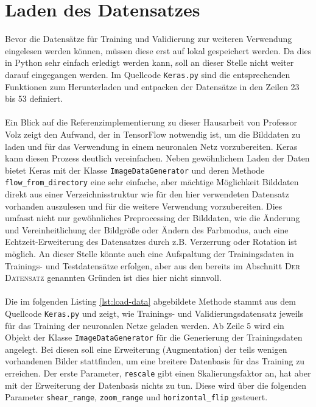 \section{Laden des Datensatzes}
Bevor die Datensätze für Training und Validierung zur weiteren Verwendung eingelesen werden können, müssen diese erst auf lokal gespeichert werden. Da dies in Python sehr einfach erledigt werden kann, soll an dieser Stelle nicht weiter darauf eingegangen werden. Im Quellcode \texttt{Keras.py} sind die entsprechenden Funktionen zum Herunterladen und entpacken der Datensätze in den Zeilen 23 bis 53 definiert. \\
\\
Ein Blick auf die Referenzimplementierung zu dieser Hausarbeit von Professor Volz zeigt den Aufwand, der in TensorFlow notwendig ist, um die Bilddaten zu laden und für das Verwendung in einem neuronalen Netz vorzubereiten. Keras kann diesen Prozess deutlich vereinfachen. Neben gewöhnlichem Laden der Daten bietet Keras mit der Klasse \texttt{ImageDataGenerator} und deren Methode \texttt{flow\_from\_directory} eine sehr einfache, aber mächtige Möglichkeit Bilddaten direkt aus einer Verzeichnisstruktur wie für den hier verwendeten Datensatz vorhanden auszulesen und für die weitere Verwendung vorzubereiten. Dies umfasst nicht nur gewöhnliches Preprocessing der Bilddaten, wie die Änderung und Vereinheitlichung der Bildgröße oder Ändern des Farbmodus, auch eine Echtzeit-Erweiterung des Datensatzes durch z.B. Verzerrung oder Rotation ist möglich. An dieser Stelle könnte auch eine Aufspaltung der Trainingsdaten in Trainings- und Testdatensätze erfolgen, aber aus den bereits im Abschnitt \textsc{Der Datensatz} genannten Gründen ist dies hier nicht sinnvoll.\\
\\
Die im folgenden Listing \ref{lst:load-data} abgebildete Methode stammt aus dem Quellcode \texttt{Keras.py} und zeigt, wie Trainings- und Validierungsdatensatz jeweils für das Training der neuronalen Netze geladen werden.
Ab Zeile 5 wird ein Objekt der Klasse \texttt{ImageDataGenerator} für die Generierung der Trainingsdaten angelegt. Bei diesen soll eine Erweiterung (Augmentation) der teils wenigen vorhandenen Bilder stattfinden, um eine breitere Datenbasis für das Training zu erreichen. Der erste Parameter, \texttt{rescale} gibt einen Skalierungsfaktor an, hat aber mit der Erweiterung der Datenbasis nichts zu tun. Diese wird über die folgenden Parameter \texttt{shear\_range}, \texttt{zoom\_range} und \texttt{horizontal\_flip} gesteuert. \\
